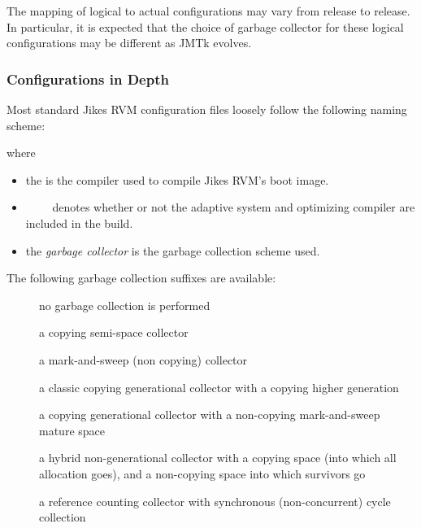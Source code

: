 The mapping of logical to actual configurations may vary from release
to release.  In particular, it is expected that the choice of garbage
collector for these logical configurations may be different as JMTk
evolves. 

\subsubsection{Configurations in Depth}

Most standard Jikes RVM configuration files loosely follow the
following naming scheme:
\begin{verse}
       \Mlbr{}  \Mor{}  \Mrbr{}
\end{verse}

%
%
where
\begin{itemize}
\item the  is the compiler used to compile
Jikes RVM's boot image. 
\item
 \Mlbr{}~~\Mor~~\Mrbr{} denotes whether or
 not the adaptive system and optimizing compiler are included in the
 build.  
\item the {\em garbage collector} is the garbage collection scheme used.
\end{itemize}

The following garbage collection suffixes are available:

\begin{description}
\item[] no garbage collection is performed
\item[] a copying semi-space collector
\item[] a mark-and-sweep (non copying) collector
\item[] a classic copying generational collector with a copying
  higher generation
\item[] a copying generational collector with a non-copying
  mark-and-sweep mature space
\item[] a hybrid non-generational collector with a copying space
  (into which all allocation goes), and a non-copying space into which
  survivors go
\item[] a reference counting collector with synchronous
  (non-concurrent) cycle collection
\end{description}

